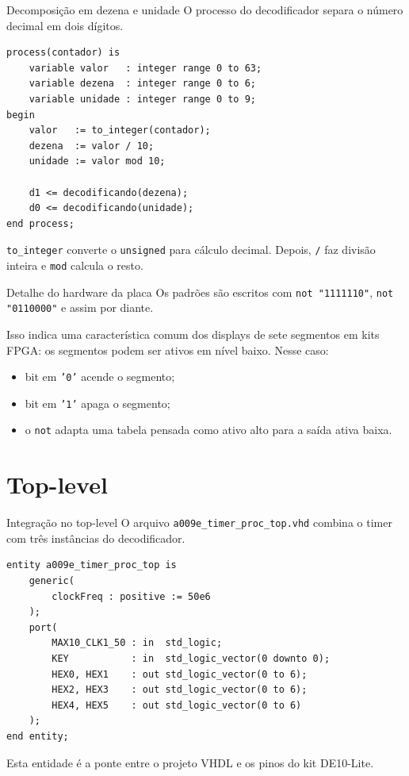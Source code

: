\documentclass[aspectratio=169,11pt]{beamer}
\begin{document}
\begin{frame}[fragile]{Decomposição em dezena e unidade}
    O processo do decodificador separa o número decimal em dois dígitos.

\begin{lstlisting}
process(contador) is
    variable valor   : integer range 0 to 63;
    variable dezena  : integer range 0 to 6;
    variable unidade : integer range 0 to 9;
begin
    valor   := to_integer(contador);
    dezena  := valor / 10;
    unidade := valor mod 10;

    d1 <= decodificando(dezena);
    d0 <= decodificando(unidade);
end process;
\end{lstlisting}

    \vspace{0.4em}
    \texttt{to\_integer} converte o \texttt{unsigned} para cálculo decimal. Depois, \texttt{/} faz divisão inteira e \texttt{mod} calcula o resto.
\end{frame}

\begin{frame}{Detalhe do hardware da placa}
    Os padrões são escritos com \texttt{not "1111110"}, \texttt{not "0110000"} e assim por diante.

    \vspace{0.5em}
    Isso indica uma característica comum dos displays de sete segmentos em kits FPGA: os segmentos podem ser ativos em nível baixo. Nesse caso:
    \begin{itemize}
        \item bit em \texttt{'0'} acende o segmento;
        \item bit em \texttt{'1'} apaga o segmento;
        \item o \texttt{not} adapta uma tabela pensada como ativo alto para a saída ativa baixa.
    \end{itemize}
\end{frame}

\section{Top-level}

\begin{frame}[fragile]{Integração no top-level}
    O arquivo \texttt{a009e\_timer\_proc\_top.vhd} combina o timer com três instâncias do decodificador.

\begin{lstlisting}
entity a009e_timer_proc_top is
    generic(
        clockFreq : positive := 50e6
    );
    port(
        MAX10_CLK1_50 : in  std_logic;
        KEY           : in  std_logic_vector(0 downto 0);
        HEX0, HEX1    : out std_logic_vector(0 to 6);
        HEX2, HEX3    : out std_logic_vector(0 to 6);
        HEX4, HEX5    : out std_logic_vector(0 to 6)
    );
end entity;
\end{lstlisting}

    \vspace{0.3em}
    Esta entidade é a ponte entre o projeto VHDL e os pinos do kit DE10-Lite.
\end{frame}
\end{document}
